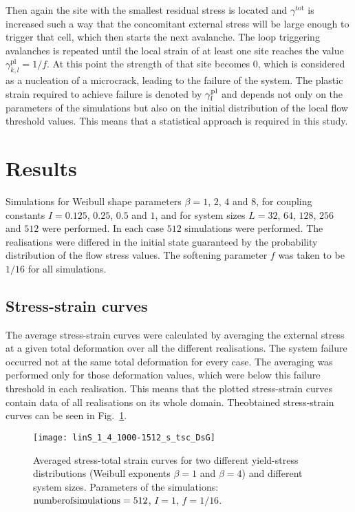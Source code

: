 Then again the site with the smallest residual stress is located and ${\gamma ^{{\text{tot}}}}$ is increased such a way that the concomitant external stress will be large enough to trigger that cell, which then starts the next avalanche. The loop triggering avalanches is repeated until the local strain of at least one site reaches the value $\gamma _{k,l}^{{\text{pl}}} = 1/f$. At this point the strength of that site becomes $0$, which is considered as a nucleation of a microcrack, leading to the failure of the system. The plastic strain required to achieve failure is denoted by $\gamma _{\rm{f}}^{{\text{pl}}}$ and depends not only on the parameters of the simulations but also on the initial distribution of the local flow threshold values. This means that a statistical approach is required in this study.

\section{Results}
Simulations for Weibull shape parameters $\beta  = 1$, $2$, $4$ and $8$, for coupling constants $I = 0.125$, $0.25$, $0.5$ and $1$, and for system sizes $L = 32$, $64$, $128$, $256$ and $512$ were performed. In each case $512$ simulations were performed. The realisations were differed in the initial state guaranteed by the probability distribution of the flow stress values. The softening parameter $f$ was taken to be $1/16$ for all simulations.

\subsection{Stress-strain curves}
The average stress-strain curves were calculated by averaging the external stress at a given total deformation over all the different realisations. The system failure occurred not at the same total deformation for every case. The averaging was performed only for those deformation values, which were below this failure threshold in each realisation. This means that the plotted stress-strain curves contain data of all realisations on its whole domain. Theobtained  stress-strain curves can be seen in Fig.~\ref{fig:disorder_stress_strain}.


\begin{figure}[htbp!] 
\centering    
\texttt{[image: linS\_1\_4\_1000-1512\_s\_tsc\_DsG]}
\caption[Stress-total strain curves of different disordered materials]{Averaged stress-total strain curves for two different yield-stress distributions (Weibull exponents $\beta=1$ and $\beta=4$) and different system sizes. Parameters of the simulations: ${\rm{number of simulations}} = 512$, $I=1$, $f=1/16$.}
\label{fig:disorder_stress_strain}
\end{figure}

